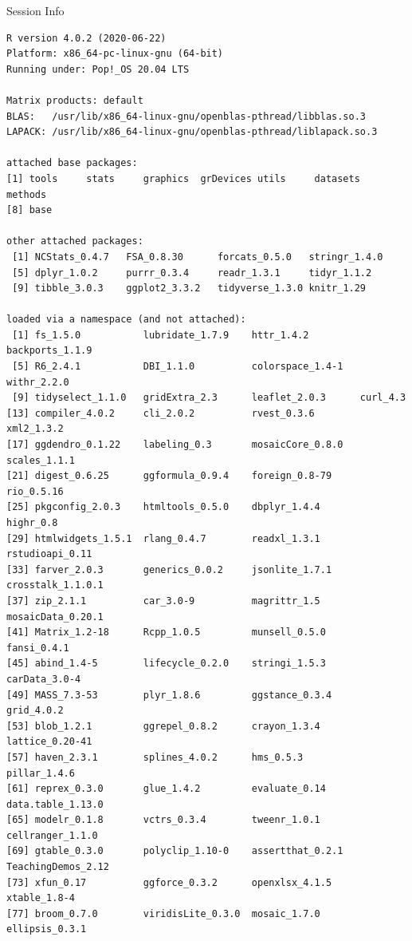 \documentclass[10pt]{beamer}\usepackage[]{graphicx}\usepackage[]{color}
\makeatletter
\newenvironment{kframe}{%
 \def\at@end@of@kframe{}%
 \ifinner\ifhmode%
  \def\at@end@of@kframe{\end{minipage}}%
  \begin{minipage}{\columnwidth}%
 \fi\fi%
 \def\FrameCommand##1{\hskip\@totalleftmargin \hskip-\fboxsep
 \colorbox{shadecolor}{##1}\hskip-\fboxsep
     \hskip-\linewidth \hskip-\@totalleftmargin \hskip\columnwidth}%
 \MakeFramed {\advance\hsize-\width
   \@totalleftmargin\z@ \linewidth\hsize
   \@setminipage}}%
 {\par\unskip\endMakeFramed%
 \at@end@of@kframe}
\newenvironment{knitrout}{}{} %
\makeatother
\begin{document}
\begin{frame}[fragile]{Session Info}
	\tiny
	
\begin{knitrout}\tiny
{}\color{fgcolor}\begin{kframe}
\begin{verbatim}
R version 4.0.2 (2020-06-22)
Platform: x86_64-pc-linux-gnu (64-bit)
Running under: Pop!_OS 20.04 LTS

Matrix products: default
BLAS:   /usr/lib/x86_64-linux-gnu/openblas-pthread/libblas.so.3
LAPACK: /usr/lib/x86_64-linux-gnu/openblas-pthread/liblapack.so.3

attached base packages:
[1] tools     stats     graphics  grDevices utils     datasets  methods  
[8] base     

other attached packages:
 [1] NCStats_0.4.7   FSA_0.8.30      forcats_0.5.0   stringr_1.4.0  
 [5] dplyr_1.0.2     purrr_0.3.4     readr_1.3.1     tidyr_1.1.2    
 [9] tibble_3.0.3    ggplot2_3.3.2   tidyverse_1.3.0 knitr_1.29     

loaded via a namespace (and not attached):
 [1] fs_1.5.0           lubridate_1.7.9    httr_1.4.2         backports_1.1.9   
 [5] R6_2.4.1           DBI_1.1.0          colorspace_1.4-1   withr_2.2.0       
 [9] tidyselect_1.1.0   gridExtra_2.3      leaflet_2.0.3      curl_4.3          
[13] compiler_4.0.2     cli_2.0.2          rvest_0.3.6        xml2_1.3.2        
[17] ggdendro_0.1.22    labeling_0.3       mosaicCore_0.8.0   scales_1.1.1      
[21] digest_0.6.25      ggformula_0.9.4    foreign_0.8-79     rio_0.5.16        
[25] pkgconfig_2.0.3    htmltools_0.5.0    dbplyr_1.4.4       highr_0.8         
[29] htmlwidgets_1.5.1  rlang_0.4.7        readxl_1.3.1       rstudioapi_0.11   
[33] farver_2.0.3       generics_0.0.2     jsonlite_1.7.1     crosstalk_1.1.0.1 
[37] zip_2.1.1          car_3.0-9          magrittr_1.5       mosaicData_0.20.1 
[41] Matrix_1.2-18      Rcpp_1.0.5         munsell_0.5.0      fansi_0.4.1       
[45] abind_1.4-5        lifecycle_0.2.0    stringi_1.5.3      carData_3.0-4     
[49] MASS_7.3-53        plyr_1.8.6         ggstance_0.3.4     grid_4.0.2        
[53] blob_1.2.1         ggrepel_0.8.2      crayon_1.3.4       lattice_0.20-41   
[57] haven_2.3.1        splines_4.0.2      hms_0.5.3          pillar_1.4.6      
[61] reprex_0.3.0       glue_1.4.2         evaluate_0.14      data.table_1.13.0 
[65] modelr_0.1.8       vctrs_0.3.4        tweenr_1.0.1       cellranger_1.1.0  
[69] gtable_0.3.0       polyclip_1.10-0    assertthat_0.2.1   TeachingDemos_2.12
[73] xfun_0.17          ggforce_0.3.2      openxlsx_4.1.5     xtable_1.8-4      
[77] broom_0.7.0        viridisLite_0.3.0  mosaic_1.7.0       ellipsis_0.3.1    
\end{verbatim}
\end{kframe}
\end{knitrout}
	
\end{frame}
\end{document}
